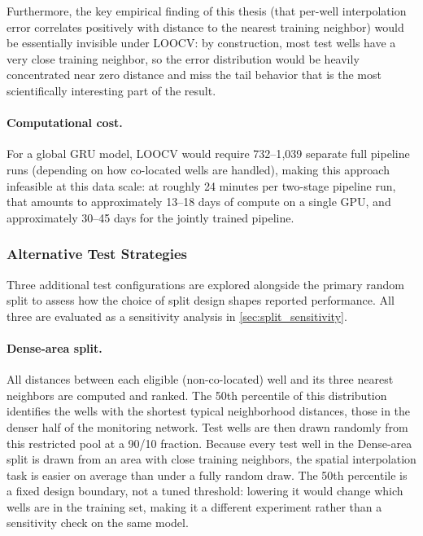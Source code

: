 Furthermore, the key empirical finding of this thesis (that per-well interpolation error
correlates positively with distance to the nearest training neighbor) would be essentially
invisible under LOOCV: by construction, most test wells have a very close training
neighbor, so the error distribution would be heavily concentrated near zero distance and miss
the tail behavior that is the most scientifically interesting part of the result.

\paragraph{Computational cost.}
For a global GRU model, LOOCV would require 732--1{,}039 separate full pipeline runs (depending on how co-located wells are handled), making this approach infeasible at this data scale: at roughly 24 minutes per two-stage pipeline run, that amounts to approximately 13--18 days of compute on a single GPU, and approximately 30--45 days for the jointly trained pipeline.

\subsubsection{Alternative Test Strategies}
\label{sec:alt_splits}

Three additional test configurations are explored alongside the primary random split to assess how the choice of split design shapes reported performance. All three are evaluated as a sensitivity analysis in \cref{sec:split_sensitivity}.

\paragraph{Dense-area split.}
All distances between each eligible (non-co-located) well and its three nearest neighbors are computed and ranked. The 50th percentile of this distribution identifies the wells with the shortest typical neighborhood distances, those in the denser half of the monitoring network. Test wells are then drawn randomly from this restricted pool at a 90/10 fraction. Because every test well in the Dense-area split is drawn from an area with close training neighbors, the spatial interpolation task is easier on average than under a fully random draw. The 50th percentile is a fixed design boundary, not a tuned threshold: lowering it would change which wells are in the training set, making it a different experiment rather than a sensitivity check on the same model.

